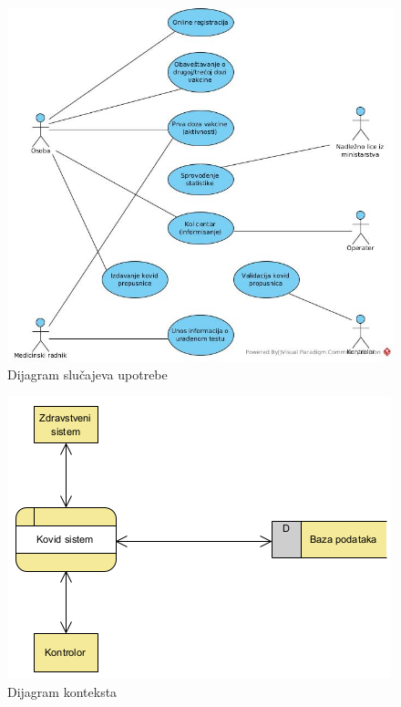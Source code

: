 \documentclass[titlepage]{article}
\begin{document}
\begin{figure}[H]
\centering
\includegraphics[scale=0.5]{Dijagram_slucajeva_upotrebe}
\caption{Dijagram slučajeva upotrebe}
\label{slk:slucajevi}
\end{figure}

\begin{figure}[H]
\centering
\includegraphics[scale=0.5]{Dijagram_konteksta}
\caption{Dijagram konteksta}
\label{slk:kontekst}
\end{figure}
\end{document}
